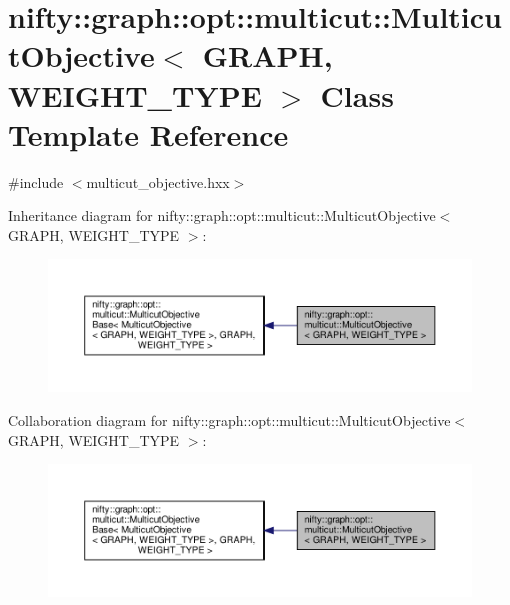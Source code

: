 \hypertarget{classnifty_1_1graph_1_1opt_1_1multicut_1_1MulticutObjective}{}\section{nifty\+:\+:graph\+:\+:opt\+:\+:multicut\+:\+:Multicut\+Objective$<$ G\+R\+A\+PH, W\+E\+I\+G\+H\+T\+\_\+\+T\+Y\+PE $>$ Class Template Reference}
\label{classnifty_1_1graph_1_1opt_1_1multicut_1_1MulticutObjective}


{\ttfamily \#include $<$multicut\+\_\+objective.\+hxx$>$}



Inheritance diagram for nifty\+:\+:graph\+:\+:opt\+:\+:multicut\+:\+:Multicut\+Objective$<$ G\+R\+A\+PH, W\+E\+I\+G\+H\+T\+\_\+\+T\+Y\+PE $>$\+:
\nopagebreak
\begin{figure}[H]
\begin{center}
\leavevmode
\includegraphics[width=350pt]{classnifty_1_1graph_1_1opt_1_1multicut_1_1MulticutObjective__inherit__graph}
\end{center}
\end{figure}


Collaboration diagram for nifty\+:\+:graph\+:\+:opt\+:\+:multicut\+:\+:Multicut\+Objective$<$ G\+R\+A\+PH, W\+E\+I\+G\+H\+T\+\_\+\+T\+Y\+PE $>$\+:
\nopagebreak
\begin{figure}[H]
\begin{center}
\leavevmode
\includegraphics[width=350pt]{classnifty_1_1graph_1_1opt_1_1multicut_1_1MulticutObjective__coll__graph}
\end{center}
\end{figure}
